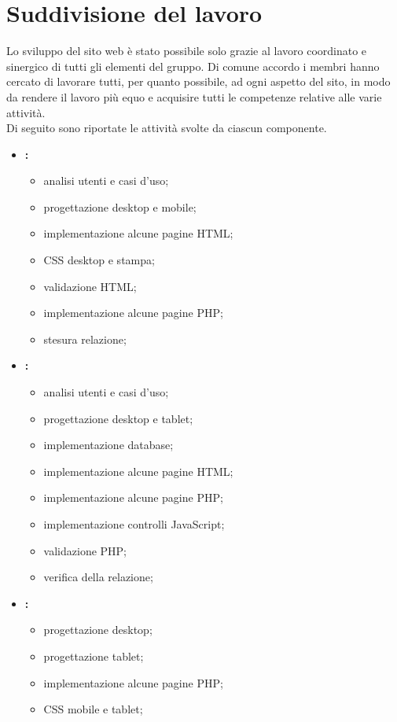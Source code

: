 \section{Suddivisione del lavoro}
\label{suddivisione-del-lavoro}
Lo sviluppo del sito web è stato possibile solo grazie al lavoro coordinato e sinergico di tutti gli elementi del gruppo. Di comune accordo i membri hanno cercato di lavorare tutti, per quanto possibile, ad ogni aspetto del sito, in modo da rendere il lavoro più equo e acquisire tutti le competenze relative alle varie attività. 
\\Di seguito sono riportate le attività svolte da ciascun componente.  
\begin{itemize}
	\item \textbf{\fiamma:}
		\begin{itemize}
			\item analisi utenti e casi d'uso;
			\item progettazione desktop e mobile;
			\item implementazione alcune pagine HTML;
			\item CSS desktop e stampa;
			\item validazione HTML;
			\item implementazione alcune pagine PHP;
			\item stesura relazione;
		\end{itemize}
	\item \textbf{\ludo:}
		\begin{itemize}
			\item analisi utenti e casi d'uso;
			\item progettazione desktop e tablet;
			\item implementazione database;
			\item implementazione alcune pagine HTML;
			\item implementazione alcune pagine PHP;
			\item implementazione controlli JavaScript;
			\item validazione PHP;
			\item verifica della relazione;
		\end{itemize}
	\item \textbf{\perin:}
		\begin{itemize}
			\item progettazione desktop;
			\item progettazione tablet;
			\item implementazione alcune pagine PHP;
			\item CSS mobile e tablet;

\end{itemize}
\end{itemize}
